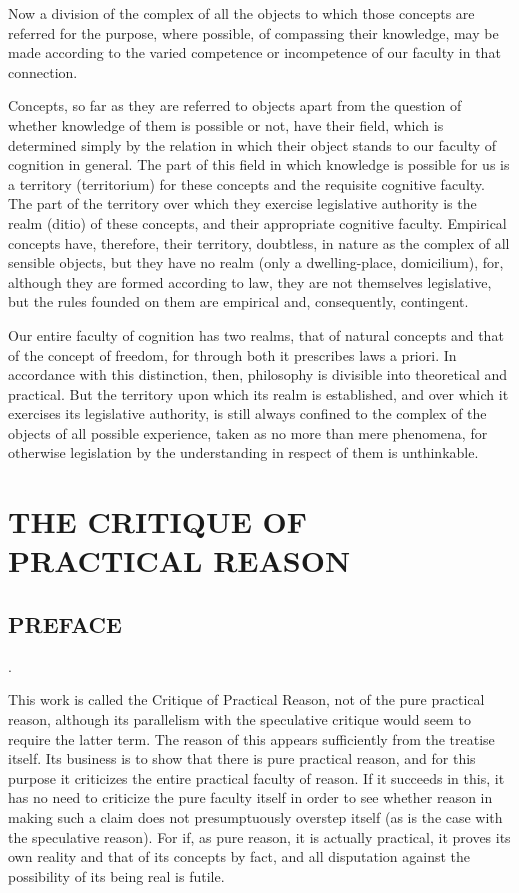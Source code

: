 \documentclass[12pt]{article}
\begin{document}
  Now a division of the complex of all the objects to which those
concepts are referred for the purpose, where possible, of compassing
their knowledge, may be made according to the varied competence or
incompetence of our faculty in that connection.

  Concepts, so far as they are referred to objects apart from the
question of whether knowledge of them is possible or not, have their
field, which is determined simply by the relation in which their
object stands to our faculty of cognition in general. The part of this
field in which knowledge is possible for us is a territory
(territorium) for these concepts and the requisite cognitive
faculty. The part of the territory over which they exercise
legislative authority is the realm (ditio) of these concepts, and
their appropriate cognitive faculty. Empirical concepts have,
therefore, their territory, doubtless, in nature as the complex of all
sensible objects, but they have no realm (only a dwelling-place,
domicilium), for, although they are formed according to law, they
are not themselves legislative, but the rules founded on them are
empirical and, consequently, contingent.

  Our entire faculty of cognition has two realms, that of natural
concepts and that of the concept of freedom, for through both it
prescribes laws a priori. In accordance with this distinction, then,
philosophy is divisible into theoretical and practical. But the
territory upon which its realm is established, and over which it
exercises its legislative authority, is still always confined to the
complex of the objects of all possible experience, taken as no more
than mere phenomena, for otherwise legislation by the understanding in
respect of them is unthinkable.

\section{THE CRITIQUE OF PRACTICAL REASON}
\subsection*{PREFACE}.

  This work is called the Critique of Practical Reason, not of the
pure practical reason, although its parallelism with the speculative
critique would seem to require the latter term. The reason of this
appears sufficiently from the treatise itself. Its business is to show
that there is pure practical reason, and for this purpose it
criticizes the entire practical faculty of reason. If it succeeds in
this, it has no need to criticize the pure faculty itself in order
to see whether reason in making such a claim does not presumptuously
overstep itself (as is the case with the speculative reason). For
if, as pure reason, it is actually practical, it proves its own
reality and that of its concepts by fact, and all disputation
against the possibility of its being real is futile.
\end{document}
